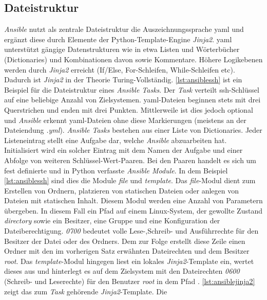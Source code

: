 \documentclass[titlepage]{report}
\begin{document}
\subsection*{Dateistruktur}
\emph{Ansible} nutzt als zentrale Dateistruktur die Auszeichnungssprache
\gls{yaml} und ergänzt diese durch Elemente der
Python\hyp{}Template\hyp{}Engine \emph{Jinja2}. \gls{yaml} unterstützt
gängige Datenstrukturen wie in etwa Listen und Wörterbücher
(Dictionaries) und Kombinationen davon sowie Kommentare. Höhere
Logikebenen werden durch \emph{Jinja2} erreicht (If/Else,
For\hyp{}Schleifen, While\hyp{}Schleifen etc). Dadurch ist \emph{Jinja2}
in der Theorie Turing-Vollständig. \autoref{lst:ansiblessh} ist ein
Beispiel für die Dateistruktur eines \emph{Ansible Tasks}. Der
\emph{Task} verteilt \gls{ssh}\hyp{}Schlüssel auf eine beliebige Anzahl
von Zielsystemen.  \gls{yaml}\hyp{}Dateien beginnen stets mit drei
Querstrichen und enden mit drei Punkten.  Mittlerweile ist dies jedoch
optional und \emph{Ansible} erkennt \gls{yaml}\hyp{}Dateien ohne diese
Markierungen (meistens an der Dateiendung \emph{.yml}). \emph{Ansible
Tasks} bestehen aus einer Liste von Dictionaries. Jeder Listeneintrag
stellt eine Aufgabe dar, welche \emph{Ansible} abzuarbeiten hat.
Initialisiert wird ein solcher Eintrag mit dem Namen der Aufgabe und
einer Abfolge von weiteren Schlüssel\hyp{}Wert\hyp{}Paaren. Bei den
Paaren handelt es sich um fest definierte und in Python verfasste
\emph{Ansible Module}. In dem Beispiel \autoref{lst:ansiblessh} sind
dies die Module \emph{file} und \emph{template}. Das
\emph{file}\hyp{}Modul dient zum Erstellen von Ordnern, platzieren von
statischen Dateien oder anlegen von Dateien mit statischen Inhalt.
Diesem Modul werden eine Anzahl von Parametern übergeben. In diesem Fall
ein Pfad auf einem Linux\hyp{}System, der gewollte Zustand
\emph{directory} sowie ein Besitzer, eine Gruppe und eine Konfiguration
der Dateiberechtigung. \emph{0700} bedeutet volle
Lese\hyp{},Schreib\hyp{} und Ausführrechte für den Besitzer der Datei
oder des Ordners. Dem zur Folge erstellt diese Zeile einen Ordner mit
den im vorherigen Satz erwähnten Dateirechten und dem Besitzer
\emph{root}. Das \emph{template}\hyp{}Modul hingegen liest ein lokales
\emph{Jinja2}\hyp{}Template ein, wertet dieses aus und hinterlegt es auf
dem Zielsystem mit den Dateirechten \emph{0600} (Schreib\hyp{} und
Leserechte) für den Benutzer \emph{root} in dem Pfad
. \autoref{lst:ansiblejinja2}
zeigt das zum \emph{Task} gehörende \emph{Jinja2}\hyp{}Template. Die
\end{document}
